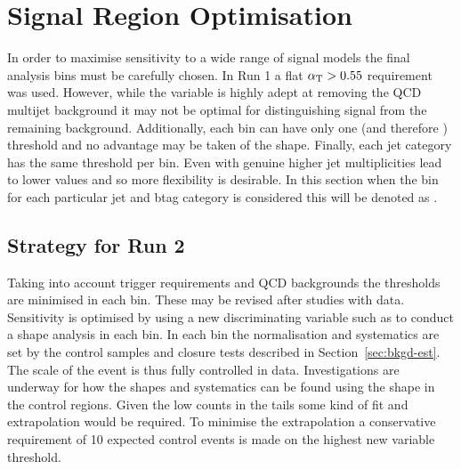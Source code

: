 
\chapter{Signal Region Optimisation} %

\label{Chapter3} %



In order to maximise sensitivity to a wide range of signal models 
the final analysis bins must be carefully chosen. 
In Run 1 a flat $\alpha_{\text{T}} > 0.55$ requirement was used. However, 
while the \alphat variable is highly adept at removing the
QCD multijet background it may not be optimal for distinguishing 
signal from the remaining background. Additionally, each bin can have
only one \alphat (and therefore \mht) threshold and no advantage 
may be taken of the shape. Finally, each jet category has the same 
\alphat threshold per \scalht bin. Even with genuine \met  higher jet multiplicities lead to 
lower \alphat values and so more flexibility is desirable. 
In this section when the \scalht bin for each particular jet and btag 
category is considered this will be denoted as \scalhtcat.


\section{Strategy for Run 2}

Taking into account trigger requirements and QCD backgrounds the \alphat thresholds are minimised in each bin. These may be revised after studies with data. Sensitivity is optimised
by using a new discriminating variable such as \mht to conduct a shape analysis in each \scalhtcat bin. 
In each \scalhtcat bin the normalisation and systematics are set by the control samples
and closure tests described in Section~\ref{sec:bkgd-est}. The scale of the event is
thus fully controlled in data. Investigations are underway for how the shapes 
and systematics can be found using the shape in the control regions. Given the low
counts in the tails some kind of fit and extrapolation would be required. To minimise the extrapolation a conservative requirement of 10 expected control events is made on the highest new variable threshold. 

